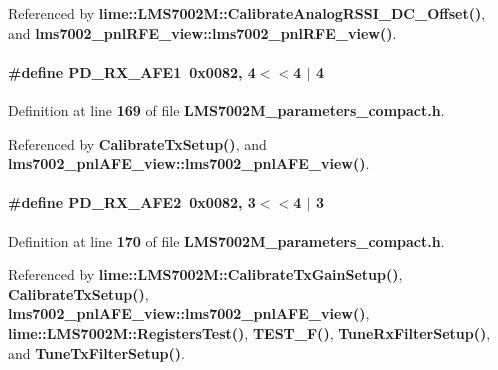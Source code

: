 Referenced by {\bf lime\+::\+L\+M\+S7002\+M\+::\+Calibrate\+Analog\+R\+S\+S\+I\+\_\+\+D\+C\+\_\+\+Offset()}, and {\bf lms7002\+\_\+pnl\+R\+F\+E\+\_\+view\+::lms7002\+\_\+pnl\+R\+F\+E\+\_\+view()}.

\paragraph[{P\+D\+\_\+\+R\+X\+\_\+\+A\+F\+E1}]{\setlength{\rightskip}{0pt plus 5cm}\#define P\+D\+\_\+\+R\+X\+\_\+\+A\+F\+E1~0x0082, 4$<$$<$4 $\vert$  4}\label{LMS7002M__parameters__compact_8h_a008f8cbdde9e9db1791c7287b791edf8}


Definition at line {\bf 169} of file {\bf L\+M\+S7002\+M\+\_\+parameters\+\_\+compact.\+h}.



Referenced by {\bf Calibrate\+Tx\+Setup()}, and {\bf lms7002\+\_\+pnl\+A\+F\+E\+\_\+view\+::lms7002\+\_\+pnl\+A\+F\+E\+\_\+view()}.

\paragraph[{P\+D\+\_\+\+R\+X\+\_\+\+A\+F\+E2}]{\setlength{\rightskip}{0pt plus 5cm}\#define P\+D\+\_\+\+R\+X\+\_\+\+A\+F\+E2~0x0082, 3$<$$<$4 $\vert$  3}\label{LMS7002M__parameters__compact_8h_a3b805543390b9688bcba6e655124314e}


Definition at line {\bf 170} of file {\bf L\+M\+S7002\+M\+\_\+parameters\+\_\+compact.\+h}.



Referenced by {\bf lime\+::\+L\+M\+S7002\+M\+::\+Calibrate\+Tx\+Gain\+Setup()}, {\bf Calibrate\+Tx\+Setup()}, {\bf lms7002\+\_\+pnl\+A\+F\+E\+\_\+view\+::lms7002\+\_\+pnl\+A\+F\+E\+\_\+view()}, {\bf lime\+::\+L\+M\+S7002\+M\+::\+Registers\+Test()}, {\bf T\+E\+S\+T\+\_\+\+F()}, {\bf Tune\+Rx\+Filter\+Setup()}, and {\bf Tune\+Tx\+Filter\+Setup()}.

